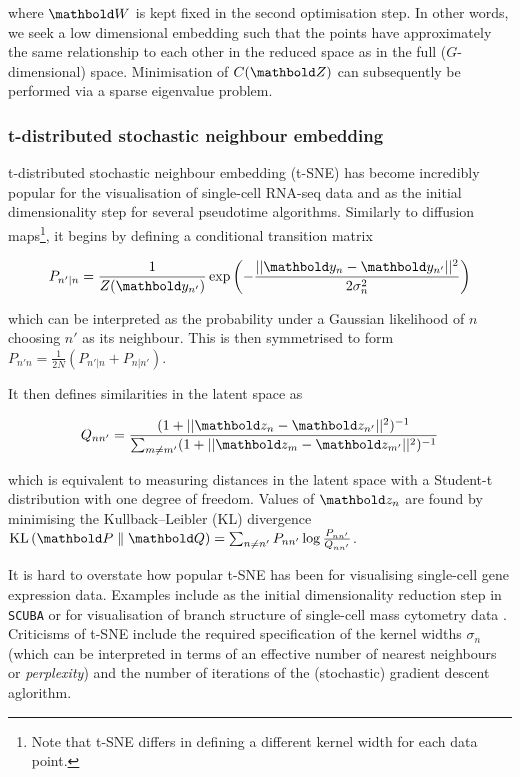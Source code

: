 where $\mbW$ is kept fixed in the second optimisation step. In other words, we seek a low dimensional embedding such that the points have approximately the same relationship to each other in the reduced space as in the full ($G$-dimensional) space. Minimisation of $C(\mbZ)$ can subsequently be performed via a sparse eigenvalue problem.

\subsubsection{t-distributed stochastic neighbour embedding} \label{sec:tsne}

t-distributed stochastic neighbour embedding (t-SNE) \cite{maaten2008visualizing} has become incredibly popular for the visualisation of single-cell RNA-seq data and as the initial dimensionality step for several pseudotime algorithms. Similarly to diffusion maps\footnote{
Note that t-SNE differs in defining a different kernel width for each data point.
}, it begins by defining a conditional transition matrix

\begin{equation}
  P_{n'|n} = \frac{1}{Z(\mby_{n'})} \exp\left( - \frac{\lvert \lvert \mby_n - \mby_{n'} \rvert \rvert^2}{2 \sigma_n^2}\right)
\end{equation}

which can be interpreted as the probability under a Gaussian likelihood of $n$ choosing $n'$ as its neighbour. This is then symmetrised to form $P_{n'n} = \frac{1}{2N}(  P_{n'|n} +   P_{n|n'})$.

It then defines similarities in the latent space as

\begin{equation}
  Q_{nn'} = \frac{
  (1 + \lvert \lvert \mbz_n - \mbz_{n'} \rvert \rvert^2)^{-1}
  }{
  \sum_{m \neq m'} (1 + \lvert \lvert \mbz_m - \mbz_{m'} \rvert \rvert^2)^{-1}
  }
\end{equation}

which is equivalent to measuring distances in the latent space with a Student-t distribution with one degree of freedom. Values of $\mbz_n$ are found by minimising the Kullback–Leibler (KL) divergence
$\KL{\mbP}{\mbQ} = \sum_{n \neq n'} P_{nn'} \log \frac{P_{nn'}}{Q_{nn'}}$.

It is hard to overstate how popular t-SNE has been for visualising single-cell gene expression data. Examples include as the initial dimensionality reduction step in \texttt{SCUBA} \cite{marco2014bifurcation} or for visualisation of branch structure of single-cell mass cytometry data \cite{setty2016wishbone}. Criticisms of t-SNE include the required specification of the kernel widths $\sigma_n$ (which can be interpreted in terms of an effective number of nearest neighbours or \emph{perplexity}) and the number of iterations of the (stochastic) gradient descent aglorithm.


